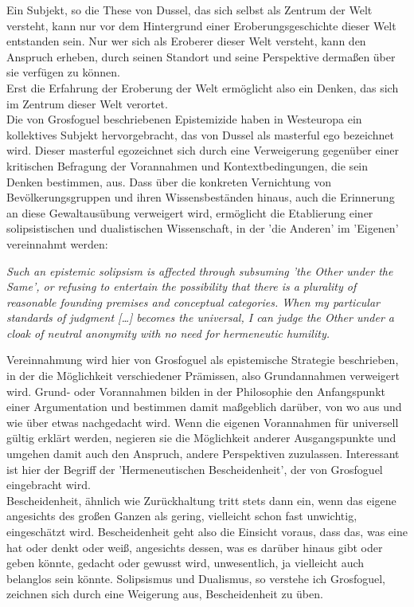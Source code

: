 Ein Subjekt, so die These von Dussel, das sich selbst als Zentrum der Welt
versteht, kann nur vor dem Hintergrund einer Eroberungsgeschichte dieser Welt
entstanden sein. Nur wer sich als Eroberer dieser Welt versteht, kann den
Anspruch erheben, durch seinen Standort und seine Perspektive dermaßen über sie
verfügen zu können.\\
Erst die Erfahrung der Eroberung der Welt ermöglicht also
ein Denken, das sich im Zentrum dieser Welt verortet. \\
Die von Grosfoguel
beschriebenen Epistemizide haben in Westeuropa ein kollektives Subjekt
hervorgebracht, das von Dussel als \glqq masterful ego\grqq \footnotemark
{} bezeichnet wird. Dieser
\glqq masterful ego\grqq zeichnet sich durch eine Verweigerung gegenüber einer
kritischen Befragung der Vorannahmen und Kontextbedingungen, die sein Denken
bestimmen, aus. Dass über die konkreten Vernichtung von Bevölkerungsgruppen und
ihren Wissensbeständen hinaus, auch die Erinnerung an diese Gewaltausübung
verweigert wird, ermöglicht die Etablierung einer solipsistischen und
dualistischen Wissenschaft, in der 'die Anderen' im 'Eigenen' vereinnahmt
werden:
\begin{myenv} 
  \textit{\glqq Such an epistemic solipsism is affected through
    subsuming  'the Other under the Same', or refusing to entertain the
    possibility that there is a plurality of reasonable founding premises and
    conceptual categories. When my particular standards of judgment […] becomes
    the universal, I can judge the Other under a cloak of neutral anonymity
    with no need for hermeneutic humility.\grqq \footnotemark {} }
\end{myenv}
Vereinnahmung wird hier von Grosfoguel als epistemische Strategie beschrieben,
in der die Möglichkeit verschiedener Prämissen, also Grundannahmen verweigert
wird. Grund- oder Vorannahmen bilden in der Philosophie den Anfangspunkt einer
Argumentation und bestimmen damit maßgeblich darüber, von wo aus und wie über
etwas nachgedacht wird. Wenn die eigenen Vorannahmen für universell gültig
erklärt werden, negieren sie die Möglichkeit anderer Ausgangspunkte und umgehen
damit auch den Anspruch, andere Perspektiven zuzulassen. Interessant ist hier
der Begriff der 'Hermeneutischen Bescheidenheit', der von Grosfoguel
eingebracht wird. \\
Bescheidenheit, ähnlich wie Zurückhaltung tritt stets dann
ein, wenn das eigene angesichts des großen Ganzen als gering, vielleicht schon
fast unwichtig, eingeschätzt wird. Bescheidenheit geht also die Einsicht
voraus, dass das, was eine hat oder denkt oder weiß, angesichts dessen, was es
darüber hinaus gibt oder geben könnte, gedacht oder gewusst wird, unwesentlich,
ja vielleicht auch belanglos sein könnte. Solipsismus und Dualismus, so
verstehe ich Grosfoguel, zeichnen sich durch eine Weigerung aus, Bescheidenheit
zu üben.\\

